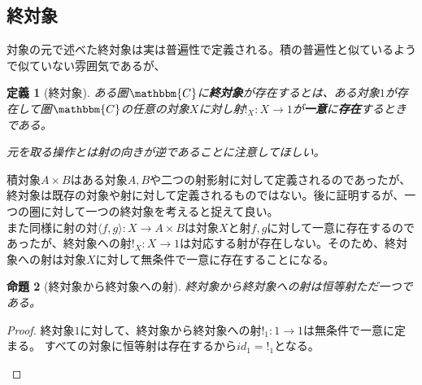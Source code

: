 \documentclass[uplatex,dvipdfmx]{jsarticle}
\newcommand{\cat}[1]{\mathbbm{#1}}
\newcommand{\arrow}{\rightarrow}
\newcommand{\tuple}[1]{\langle #1\rangle}
\newcommand{\mor}[3]{#1:#2\arrow #3}
\newtheorem{proof}{証明}[section]
\newtheorem{prop}[proof]{命題}
\newtheorem{define}[proof]{定義}
\numberwithin{proof}{subsection}
\begin{document}
	\subsection{終対象}
  対象の元で述べた終対象は実は普遍性で定義される。積の普遍性と似ているようで似ていない雰囲気であるが、
	\begin{define}[終対象]
		ある圏$\cat{C}$に\textbf{終対象}が存在するとは、ある対象$1$が存在して圏$\cat{C}$の任意の対象$X$に対し射$\mor{!_X}{X}{1}$が\textbf{一意}に\textbf{存在}するときである。

		元を取る操作とは射の向きが逆であることに注意してほしい。
	\end{define}
  積対象$A\times B$はある対象$A,B$や二つの射影射に対して定義されるのであったが、終対象は既存の対象や射に対して定義されるものではない。後に証明するが、一つの圏に対して一つの終対象を考えると捉えて良い。\\
	また同様に射の対$\mor{\tuple{f,g}}{X}{A\times B}$は対象$X$と射$f,g$に対して一意に存在するのであったが、終対象への射$\mor{!_X}{X}{1}$は対応する射が存在しない。そのため、終対象への射は対象$X$に対して無条件で一意に存在することになる。
	\begin{prop}[終対象から終対象への射]
		終対象から終対象への射は恒等射ただ一つである。
	\end{prop}
	\begin{proof}
		終対象$1$に対して、終対象から終対象への射$\mor{!_1}{1}{1}$は無条件で一意に定まる。
		すべての対象に恒等射は存在するから$id_1=!_1$となる。
		\begin{center}
		\end{center}
	\end{proof}
\end{document}
